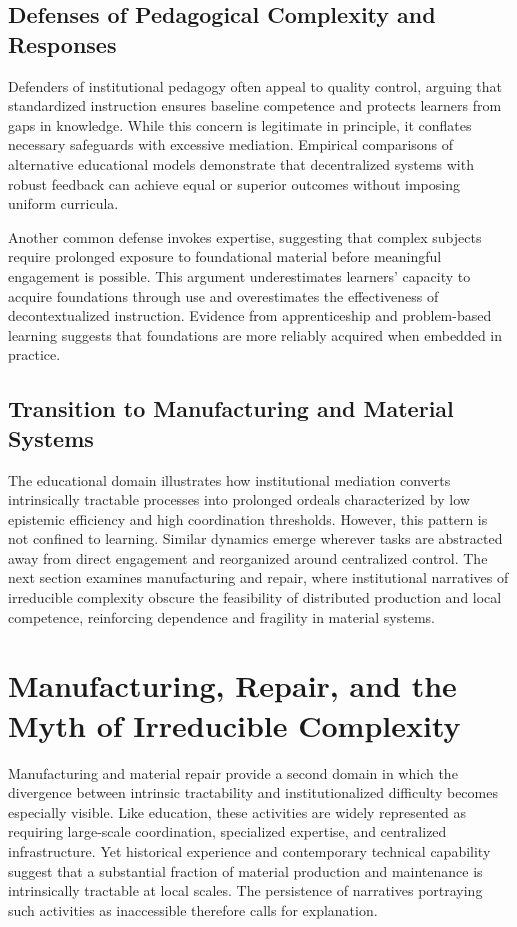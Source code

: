 \documentclass[11pt]{article}
\begin{document}
\subsection{Defenses of Pedagogical Complexity and Responses}

Defenders of institutional pedagogy often appeal to quality control, arguing that standardized instruction ensures baseline competence and protects learners from gaps in knowledge. While this concern is legitimate in principle, it conflates necessary safeguards with excessive mediation. Empirical comparisons of alternative educational models demonstrate that decentralized systems with robust feedback can achieve equal or superior outcomes without imposing uniform curricula.

Another common defense invokes expertise, suggesting that complex subjects require prolonged exposure to foundational material before meaningful engagement is possible. This argument underestimates learners’ capacity to acquire foundations through use and overestimates the effectiveness of decontextualized instruction. Evidence from apprenticeship and problem-based learning suggests that foundations are more reliably acquired when embedded in practice.

\subsection{Transition to Manufacturing and Material Systems}

The educational domain illustrates how institutional mediation converts intrinsically tractable processes into prolonged ordeals characterized by low epistemic efficiency and high coordination thresholds. However, this pattern is not confined to learning. Similar dynamics emerge wherever tasks are abstracted away from direct engagement and reorganized around centralized control. The next section examines manufacturing and repair, where institutional narratives of irreducible complexity obscure the feasibility of distributed production and local competence, reinforcing dependence and fragility in material systems.

\section{Manufacturing, Repair, and the Myth of Irreducible Complexity}

Manufacturing and material repair provide a second domain in which the divergence between intrinsic tractability and institutionalized difficulty becomes especially visible. Like education, these activities are widely represented as requiring large-scale coordination, specialized expertise, and centralized infrastructure. Yet historical experience and contemporary technical capability suggest that a substantial fraction of material production and maintenance is intrinsically tractable at local scales. The persistence of narratives portraying such activities as inaccessible therefore calls for explanation.
\end{document}
